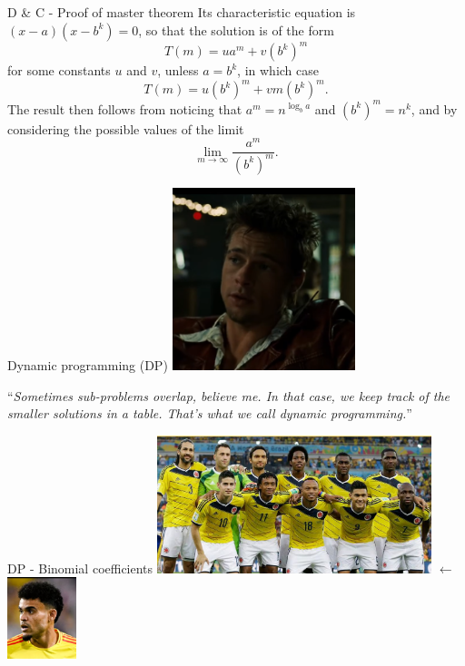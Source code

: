 \documentclass{beamer}
\begin{document}
\begin{frame}{D \& C - Proof of master theorem}
	Its characteristic equation is $(x - a)(x - b^k)= 0$, so that the solution
	is of the form
	\[
		T(m) = ua^m + v(b^k)^m
	\]
	for some constants $u$ and $v$, unless $a = b^k$, in which case
	\[
		T(m) = u(b^k)^m + vm(b^k)^m.
	\]
	The result then follows from noticing that $a^m = n^{\log_b a}$ and
	$(b^k)^m = n^k$, and by considering the possible values of the limit
	\[
		\lim_{m \to \infty} \frac{a^m}{(b^k)^m}.
	\]
\end{frame}

\begin{frame}{Dynamic programming (DP)}
	\centering
	\includegraphics[width=0.4\textwidth]{tyler.png}

	``\emph{Sometimes sub-problems overlap, believe me. In that case, we keep
		track of the smaller solutions in a table. That's what we call
		dynamic programming.}''
\end{frame}

%

\begin{frame}{DP - Binomial coefficients}
	\centering
	\includegraphics[width=0.6\textwidth]{sele2014.png}
	\hspace{0.5cm}
	$\longleftarrow$
	\hspace{0.5cm}
	\includegraphics[width=0.15\textwidth]{lucho.png}
\end{frame}
\end{document}
